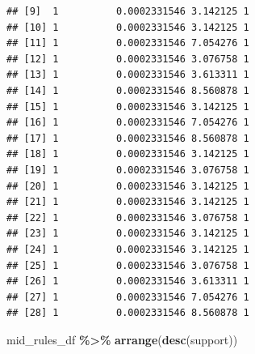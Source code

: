 \documentclass[
]{article}
\newenvironment{Shaded}{\begin{snugshade}}{\end{snugshade}}
\newcommand{\FunctionTok}[1]{\textcolor[rgb]{0.13,0.29,0.53}{\textbf{#1}}}
\newcommand{\NormalTok}[1]{#1}
\newcommand{\SpecialCharTok}[1]{\textcolor[rgb]{0.81,0.36,0.00}{\textbf{#1}}}
\begin{document}
\begin{verbatim}
## [9]  1          0.0002331546 3.142125 1    
## [10] 1          0.0002331546 3.142125 1    
## [11] 1          0.0002331546 7.054276 1    
## [12] 1          0.0002331546 3.076758 1    
## [13] 1          0.0002331546 3.613311 1    
## [14] 1          0.0002331546 8.560878 1    
## [15] 1          0.0002331546 3.142125 1    
## [16] 1          0.0002331546 7.054276 1    
## [17] 1          0.0002331546 8.560878 1    
## [18] 1          0.0002331546 3.142125 1    
## [19] 1          0.0002331546 3.076758 1    
## [20] 1          0.0002331546 3.142125 1    
## [21] 1          0.0002331546 3.142125 1    
## [22] 1          0.0002331546 3.076758 1    
## [23] 1          0.0002331546 3.142125 1    
## [24] 1          0.0002331546 3.142125 1    
## [25] 1          0.0002331546 3.076758 1    
## [26] 1          0.0002331546 3.613311 1    
## [27] 1          0.0002331546 7.054276 1    
## [28] 1          0.0002331546 8.560878 1
\end{verbatim}

\begin{Shaded}
\begin{Highlighting}[]
\NormalTok{mid\_rules\_df }\SpecialCharTok{\%\textgreater{}\%} \FunctionTok{arrange}\NormalTok{(}\FunctionTok{desc}\NormalTok{(support))}
\end{Highlighting}
\end{Shaded}
\end{document}
